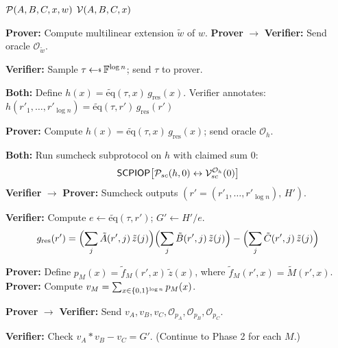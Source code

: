 \documentclass[11pt]{article}
\begin{document}
\begin{algorithm}[H]
\caption{Delphian PIOP -- First Phase}
\begin{algorithmic}[1]
\Statex \hspace{-\algorithmicindent}
  $\mathcal{P}(A, B, C, x, w)$
  \hfill
  $\mathcal{V}(A, B, C, x)$
\Statex \hrulefill

\State \textbf{Prover:} Compute multilinear extension $\tilde{w}$ of $w$.
\State \textbf{Prover} $\to$ \textbf{Verifier:} Send oracle $\mathcal{O}_{\tilde{w}}$.

\Statex
\State \textbf{Verifier:} Sample $\tau \getsr \F^{\log n}$; send $\tau$ to prover.

\Statex
\State \textbf{Both:} Define $h(x) = \widetilde{\mathrm{eq}}(\tau, x)\, g_{\mathrm{res}}(x)$.
  \Statex \quad\quad Verifier annotates: $h(r'_1, \ldots, r'_{\log n}) = \widetilde{\mathrm{eq}}(\tau, r')\, g_{\mathrm{res}}(r')$

\State \textbf{Prover:} Compute $h(x) = \widetilde{\mathrm{eq}}(\tau, x)\, g_{\mathrm{res}}(x)$; send oracle $\mathcal{O}_h$.

\Statex
\State \textbf{Both:} Run sumcheck subprotocol on $h$ with claimed sum 0:
  \[
    \mathsf{SCPIOP}\!\left[\mathcal{P}_{sc}(h, 0) \leftrightarrow \mathcal{V}_{sc}^{\mathcal{O}_h}(0)\right]
  \]
\State \textbf{Verifier} $\to$ \textbf{Prover:} Sumcheck outputs $(r' = (r'_1, \ldots, r'_{\log n}),\, H')$.

\Statex
\State \textbf{Verifier:} Compute $e \leftarrow \widetilde{\mathrm{eq}}(\tau, r')$;\;
  $G' \leftarrow H'/e$.
  \Statex \quad{}
  \[
    g_{\mathrm{res}}(r') = \Bigl(\sum_j \tilde{A}(r',j)\,\tilde{z}(j)\Bigr)
      \Bigl(\sum_j \tilde{B}(r',j)\,\tilde{z}(j)\Bigr)
      - \Bigl(\sum_j \tilde{C}(r',j)\,\tilde{z}(j)\Bigr)
  \]

\Statex
{}
  \State \textbf{Prover:} Define $p_M(x) = \tilde{f}_M(r', x)\, \tilde{z}(x)$,
    where $\tilde{f}_M(r', x) = \tilde{M}(r', x)$.
  \State \textbf{Prover:} Compute $v_M = \sum_{x \in \{0,1\}^{\log n}} p_M(x)$.
\EndFor

\State \textbf{Prover} $\to$ \textbf{Verifier:} Send $v_A, v_B, v_C, \mathcal{O}_{p_A}, \mathcal{O}_{p_B}, \mathcal{O}_{p_C}$.

\State \textbf{Verifier:} Check $v_A * v_B - v_C = G'$.
  \Statex \quad\quad (Continue to Phase 2 for each $M$.)

\end{algorithmic}
\end{algorithm}
\end{document}
